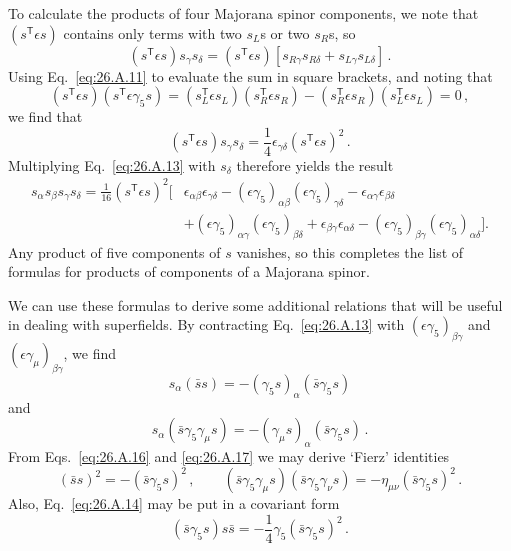 To calculate the products of four Majorana spinor components, we note that
$(s^{\mathsf T}\epsilon s)$ contains only terms with two $s_L$s or two $s_R$s, so
\[
  (s^{\mathsf T}\epsilon s)s_\gamma s_\delta
  =(s^{\mathsf T}\epsilon s)
   [s_{R\gamma}s_{R\delta}+s_{L\gamma}s_{L\delta}]\,.
\]
Using Eq.~\eqref{eq:26.A.11} to evaluate the sum in square brackets, and
noting that
\[
  (s^{\mathsf T}\epsilon s)(s^{\mathsf T}\epsilon\gamma_5s)
  =(s_L^{\mathsf T}\epsilon s_L)(s_R^{\mathsf T}\epsilon s_R)
   -(s_R^{\mathsf T}\epsilon s_R)(s_L^{\mathsf T}\epsilon s_L)=0\,,
\]
we find that
\begin{equation}
  (s^{\mathsf T}\epsilon s)s_\gamma s_\delta
  =\frac14\epsilon_{\gamma\delta}(s^{\mathsf T}\epsilon s)^2\,.
  \tag{26.A.14}\label{eq:26.A.14}
\end{equation}
Multiplying Eq.~\eqref{eq:26.A.13} with $s_\delta$ therefore yields the
result
\begin{equation}
\begin{aligned}
  s_\alpha s_\beta s_\gamma s_\delta
  =\frac1{16}(s^{\mathsf T}\epsilon s)^2\bigl[
    &\epsilon_{\alpha\beta}\epsilon_{\gamma\delta}
     -(\epsilon\gamma_5)_{\alpha\beta}
      (\epsilon\gamma_5)_{\gamma\delta}
     -\epsilon_{\alpha\gamma}\epsilon_{\beta\delta}
  \\
    &+(\epsilon\gamma_5)_{\alpha\gamma}
      (\epsilon\gamma_5)_{\beta\delta}
     +\epsilon_{\beta\gamma}\epsilon_{\alpha\delta}
     -(\epsilon\gamma_5)_{\beta\gamma}
      (\epsilon\gamma_5)_{\alpha\delta}
  \bigr].
\end{aligned}
  \tag{26.A.15}\label{eq:26.A.15}
\end{equation}
Any product of five components of $s$ vanishes, so this completes the list of
formulas for products of components of a Majorana spinor.

We can use these formulas to derive some additional relations that will be
useful in dealing with superfields. By contracting Eq.~\eqref{eq:26.A.13}
with $(\epsilon\gamma_5)_{\beta\gamma}$ and
$(\epsilon\gamma_\mu)_{\beta\gamma}$, we find
\begin{equation}
  s_\alpha(\bar{s}s)
  =-(\gamma_5s)_\alpha(\bar{s}\gamma_5s)
  \tag{26.A.16}\label{eq:26.A.16}
\end{equation}
and
\begin{equation}
  s_\alpha(\bar{s}\gamma_5\gamma_\mu s)
  =-(\gamma_\mu s)_\alpha(\bar{s}\gamma_5s)\,.
  \tag{26.A.17}\label{eq:26.A.17}
\end{equation}
From Eqs.~\eqref{eq:26.A.16} and \eqref{eq:26.A.17} we may derive `Fierz'
identities
\begin{equation}
  (\bar{s}s)^2=-(\bar{s}\gamma_5s)^2\,,
  \qquad
  (\bar{s}\gamma_5\gamma_\mu s)(\bar{s}\gamma_5\gamma_\nu s)
  =-\eta_{\mu\nu}(\bar{s}\gamma_5s)^2\,.
  \tag{26.A.18}\label{eq:26.A.18}
\end{equation}
Also, Eq.~\eqref{eq:26.A.14} may be put in a covariant form
\begin{equation}
  (\bar{s}\gamma_5s)s\bar{s}
  =-\frac14\gamma_5(\bar{s}\gamma_5s)^2\,.
  \tag{26.A.19}\label{eq:26.A.19}
\end{equation}

